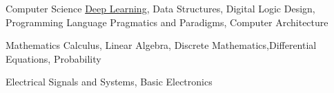 

\begin{cvskills}

  \cvskill
    {Computer Science} %
    {{\href{https://www.coursera.org/specializations/deep-learning}{Deep Learning}}, Data Structures, Digital Logic Design, Programming Language Pragmatics and Paradigms, Computer Architecture} %


  \cvskill
    {Mathematics} %
    {Calculus, Linear Algebra, Discrete Mathematics,Differential Equations, Probability} %




\cvskill
{Electrical} %
{Signals and Systems, Basic Electronics} %


\end{cvskills}
